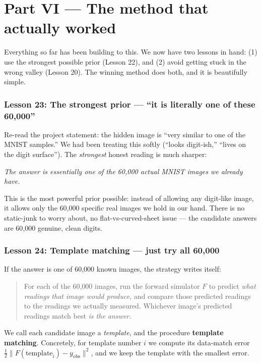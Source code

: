 \documentclass[11pt]{article}
\newcommand{\norm}[1]{\lVert #1 \rVert}
\begin{document}
\part*{Part VI --- The method that actually worked}

Everything so far has been building to this. We now have two lessons in hand:
(1) use the strongest possible prior (Lesson 22), and (2) avoid getting stuck
in the wrong valley (Lesson 20). The winning method does both, and it is
beautifully simple.

\section{Lesson 23: The strongest prior --- ``it is literally one of these 60{,}000''}

Re-read the project statement: the hidden image is ``very similar to one of
the MNIST samples.'' We had been treating this softly (``looks digit-ish,''
``lives on the digit surface''). The \emph{strongest} honest reading is much
sharper:

\begin{center}
\emph{The answer is essentially one of the 60{,}000 actual MNIST images we
already have.}
\end{center}

This is the most powerful prior possible: instead of allowing any digit-like
image, it allows only the 60{,}000 specific real images we hold in our hand.
There is no static-junk to worry about, no flat-vs-curved-sheet issue --- the
candidate answers are 60{,}000 genuine, clean digits.

\section{Lesson 24: Template matching --- just try all 60{,}000}

If the answer is one of 60{,}000 known images, the strategy writes itself:
\begin{quote}
For each of the 60{,}000 images, run the forward simulator $F$ to predict
\emph{what readings that image would produce}, and compare those predicted
readings to the readings we actually measured. Whichever image's predicted
readings match best \emph{is the answer.}
\end{quote}
We call each candidate image a \emph{template}, and the procedure
\textbf{template matching}. Concretely, for template number $i$ we compute its
data-match error $\tfrac12\norm{F(\text{template}_i)-y_{\text{obs}}}^2$, and we
keep the template with the smallest error.
\end{document}

